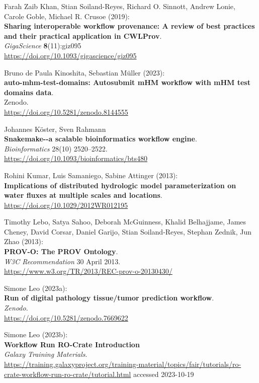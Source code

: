 \documentclass[10pt,letterpaper]{article}
\begin{document}
\begin{thebibliography}{10}
\begin{small}
 Farah Zaib Khan, Stian Soiland-Reyes, Richard O.
Sinnott, Andrew Lonie, Carole Goble, Michael R. Crusoe (2019):\\
\textbf{Sharing interoperable workflow provenance: A review of best
practices and their practical application in CWLProv}.\\
\emph{GigaScience} \textbf{8}(11):giz095\\
\url{https://doi.org/10.1093/gigascience/giz095}

 Bruno de Paula Kinoshita, Sebastian Müller
(2023):\\
\textbf{auto-mhm-test-domains: Autosubmit mHM workflow with mHM test
domains data}.\\
Zenodo.\\
\url{https://doi.org/10.5281/zenodo.8144555}

Johannes Köster, Sven Rahmann \\
\textbf{Snakemake-\/-a scalable bioinformatics workflow engine}.\\
\emph{Bioinformatics} 28(10) 2520--2522.\\
\url{https://doi.org/10.1093/bioinformatics/bts480}

 Rohini Kumar, Luis Samaniego, Sabine Attinger (2013):\\
\textbf{Implications of distributed hydrologic model parameterization on
water fluxes at multiple scales and locations}.\\
\url{https://doi.org/10.1029/2012WR012195}

 Timothy Lebo, Satya Sahoo, Deborah McGuinness, Khalid
Belhajjame, James Cheney, David Corsar, Daniel Garijo, Stian
Soiland-Reyes, Stephan Zednik, Jun Zhao (2013):\\
\textbf{PROV-O: The PROV Ontology}.\\
\emph{W3C Recommendation} 30 April 2013.\\
\url{https://www.w3.org/TR/2013/REC-prov-o-20130430/}

 Simone Leo (2023a):\\
\textbf{Run of digital pathology tissue/tumor prediction workflow}.\\
\emph{Zenodo}.\\
\url{https://doi.org/10.5281/zenodo.7669622}

Simone Leo (2023b):\\
\textbf{Workflow Run RO-Crate Introduction} \\
\emph{Galaxy Training Materials}.\\
\url{https://training.galaxyproject.org/training-material/topics/fair/tutorials/ro-crate-workflow-run-ro-crate/tutorial.html} accessed 2023-10-19


\end{small}
\end{thebibliography}
\end{document}
